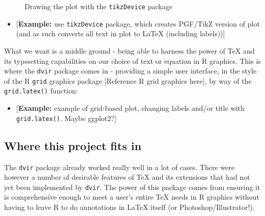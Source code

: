 \documentclass[]{article}
\providecommand{\tightlist}{%
  \setlength{\itemsep}{0pt}\setlength{\parskip}{0pt}}
\begin{document}
\begin{figure}
 \caption{Drawing the plot with the \texttt{tikzDevice} package}
 \end{figure}

\begin{itemize}
\tightlist
\item
  {[}\textbf{Example:} use \texttt{tikzDevice} package, which creates
  PGF/TikZ version of plot (and as such converts all text in plot to
  LaTeX (including labels)){]}
\end{itemize}

What we want is a middle ground - being able to harness the power of
\TeX{} and its typesetting capabilities on our choice of text or
equation in R graphics. This is where the \texttt{dvir} package comes in
- providing a simple user interface, in the style of the R \texttt{grid}
graphics package {[}Reference R grid graphics here{]}, by way of the
\texttt{grid.latex()} function:

\begin{itemize}
\tightlist
\item
  {[}\textbf{Example:} example of grid-based plot, changing labels
  and/or title with \texttt{grid.latex()}. Maybe ggplot2?{]}
\end{itemize}

\subsection{Where this project fits
in}\label{where-this-project-fits-in}

The \texttt{dvir} package already worked really well in a lot of cases.
There were however a number of desirable features of \TeX{} and its
extensions that had not yet been implemented by \texttt{dvir}. The power
of this package comes from ensuring it is comprehensive enough to meet a
user's entire \TeX{} needs in R graphics without having to leave R to do
annotations in \LaTeX{} itself (or Photoshop/Illustrator!).
\end{document}
